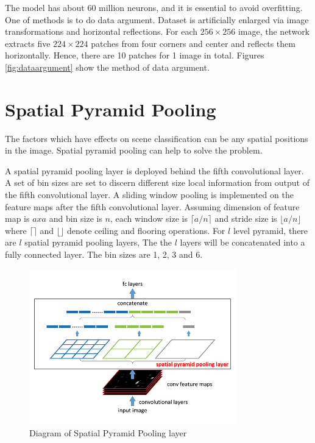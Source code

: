 The model has about 60 million neurons, and it is essential to avoid overfitting. One of methods is to do data argument. Dataset is artificially enlarged via image transformations and horizontal reflections. For each $256\times256$ image, the network extracts five $224\times224$ patches from four corners and center and reflects them horizontally. Hence, there are 10 patches for 1 image in total. Figures \ref{fig:dataargument} show the method of data argument.

\section{Spatial Pyramid Pooling}

The factors which have effects on scene classification can be any spatial positions in the image. Spatial pyramid pooling can help to solve the problem.

A spatial pyramid pooling layer is deployed behind the fifth convolutional layer. A set of bin sizes are set to discern different size local information from output of the fifth convolutional layer.  A sliding window pooling  is implemented on the feature maps after the fifth convolutional layer. Assuming dimension of feature map is $axa$ and bin size is $n$, each window size is $\lceil a/n \rceil$ and stride size is $\lfloor a/n \rfloor$ where $\lceil \rceil$ and $\lfloor \rfloor$ denote ceiling and flooring operations. For $l$ level pyramid, there are $l$ spatial pyramid pooling layers, The the $l$ layers will be concatenated into a fully connected layer. The bin sizes are 1, 2, 3 and 6.

\begin{figure}[!htb]
    \centering
	\includegraphics[width=0.8\textwidth]{sppnet.jpg}
    \caption{Diagram of Spatial Pyramid Pooling layer}%
    \label{fig:sppnet}%
\end{figure}

